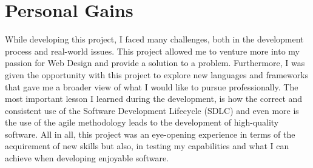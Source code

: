 \section{Personal Gains}

While developing this project, I faced many challenges, both in the development process and real-world issues. This project allowed me to venture more into my passion for Web Design and provide a solution to a problem. Furthermore, I was given the opportunity with this project to explore new languages and frameworks that gave me a broader view of what I would like to pursue professionally. The most important lesson I learned during the development, is how the correct and consistent use of the Software Development Lifecycle (SDLC) and even more is the use of the agile methodology leads to the development of high-quality software. All in all, this project was an eye-opening experience in terms of the acquirement of new skills but also, in testing my capabilities and what I can achieve when developing enjoyable software.
